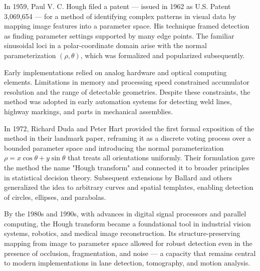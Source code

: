 
\begin{historical}
In 1959, Paul V. C. Hough filed a patent — issued in 1962 as U.S. Patent 3,069,654 — for a method of identifying complex patterns in visual data by mapping image features into a parameter space. His technique framed detection as finding parameter settings supported by many edge points. The familiar sinusoidal loci in a polar-coordinate domain arise with the normal parameterization \((\rho,\theta)\), which was formalized and popularized subsequently.

Early implementations relied on analog hardware and optical computing elements. Limitations in memory and processing speed constrained accumulator resolution and the range of detectable geometries. Despite these constraints, the method was adopted in early automation systems for detecting weld lines, highway markings, and parts in mechanical assemblies.

In 1972, Richard Duda and Peter Hart provided the first formal exposition of the method in their landmark paper, reframing it as a discrete voting process over a bounded parameter space and introducing the normal parameterization \(\rho = x\cos\theta + y\sin\theta\) that treats all orientations uniformly. Their formulation gave the method the name "Hough transform" and connected it to broader principles in statistical decision theory. Subsequent extensions by Ballard and others generalized the idea to arbitrary curves and spatial templates, enabling detection of circles, ellipses, and parabolas.

By the 1980s and 1990s, with advances in digital signal processors and parallel computing, the Hough transform became a foundational tool in industrial vision systems, robotics, and medical image reconstruction. Its structure-preserving mapping from image to parameter space allowed for robust detection even in the presence of occlusion, fragmentation, and noise  —  a capacity that remains central to modern implementations in lane detection, tomography, and motion analysis. 
\end{historical}